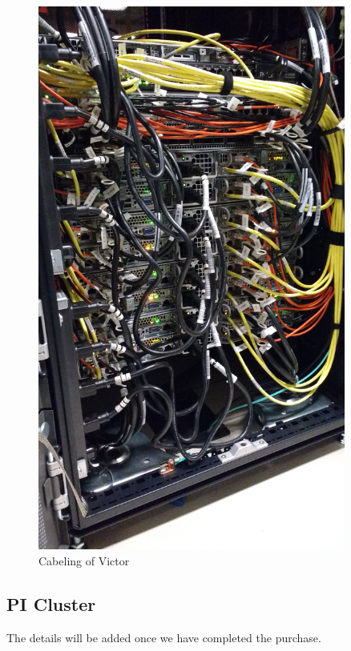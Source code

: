   \begin{figure}[!htbp]
    \centering
    \includegraphics[width=0.9\textwidth]{images/victor.jpg}
    \caption{Cabeling of Victor}\label{F:victor}
  \end{figure}

\subsection{PI Cluster}

The details will be added once we have completed the purchase.
